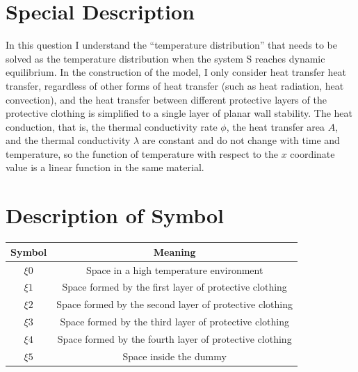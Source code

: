 \documentclass[12pt]{ctexart}
\begin{document}
\section{Special Description}
In this question I understand the “temperature distribution” that needs to be solved as the temperature distribution when the system S reaches dynamic equilibrium.
In the construction of the model, I only consider heat transfer heat transfer, regardless of other forms of heat transfer (such as heat radiation, heat convection), and the heat transfer between different protective layers of the protective clothing is simplified to a single layer of planar wall stability. The heat conduction, that is, the thermal conductivity rate $\phi$, the heat transfer area $A$, and the thermal conductivity $\lambda$ are constant and do not change with time and temperature, so the function of temperature with respect to the $x$ coordinate value is a linear function in the same material.
\section{Description of Symbol}

\begin{center}
\begin{tabular}{|c|c|}
\toprule
Symbol & Meaning\\
\midrule
$\xi{0}$ & Space in a high temperature environment\\
\midrule
$\xi{1}$ & Space formed by the first layer of protective clothing\\
\midrule
$\xi{2}$ & Space formed by the second layer of protective clothing\\
\midrule
$\xi{3}$ & Space formed by the third layer of protective clothing\\
\midrule
$\xi{4}$ & Space formed by the fourth layer of protective clothing\\
\midrule
$\xi{5}$ & Space inside the dummy\\
\bottomrule
\end{tabular}
\end{center}
\end{document}
